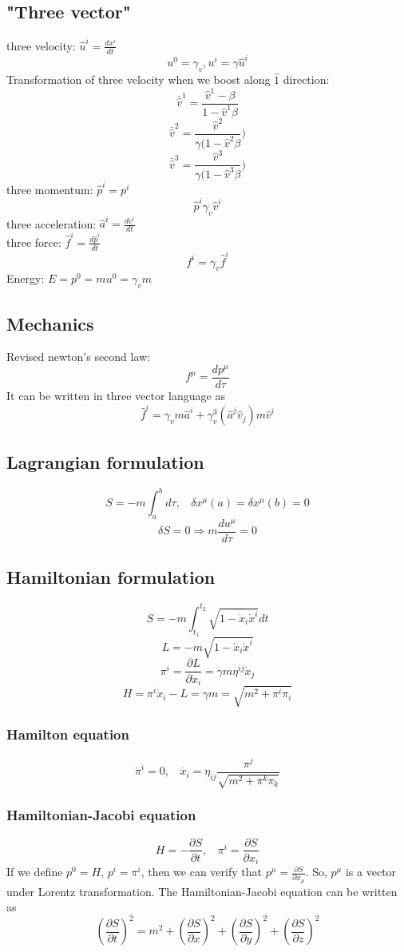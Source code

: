 \documentclass{article}
\begin{document}
\subsection{"Three vector"}
three velocity: $\hat{u}^{i} = \frac{dx^i}{dt}$
\[u^0 = \gamma_v, u^i = \gamma \hat{u}^i\]
Transformation of three velocity when we boost along $\hat{1}$ direction:
\[\bar{\hat{v}}^1 = \frac{\hat{v}^1 - \beta}{1-\hat{v}^1 \beta}\]
\[\bar{\hat{v}}^2 = \frac{\hat{v}^2}{\gamma(1-\hat{v}^2 \beta})\]
\[\bar{\hat{v}}^3 = \frac{\hat{v}^3}{\gamma(1-\hat{v}^3 \beta})\]
three momentum: $\hat{p}^{i} = p^i$
\[\hat{p}^{i} \gamma_v \hat{v}^i\]
three acceleration: $\hat{a}^{i} = \frac{dv^i}{dt}$\\
three force: $\hat{f}^i = \frac{d\hat{p}^i}{dt}$
\[f^i = \gamma_v \hat{f}^i\]
Energy: $E = p^0 = m u^0 = \gamma_v m$


\subsection{Mechanics}
Revised newton's second law:
\[f^{\mu} = \frac{dp^{\mu}}{d\tau}\]
It can be written in three vector language as
\[\hat{f}^i = \gamma_v m \hat{a}^i + \gamma_v^3 (\hat{a}^j \hat{v}_j) m \hat{v}^i\]

\subsection{Lagrangian formulation}
\[S=-m\int_{a}^{b} d\tau, \ \ \ \ \delta x^{\mu}(a) = \delta x^{\mu}(b) = 0\]
\[\delta S = 0 \Rightarrow m\frac{du^{\mu}}{d\tau} = 0\]

\subsection{Hamiltonian formulation}
\[S = -m \int_{t_1}^{t_2} \sqrt{1-\dot{x}_i\dot{x}^i} dt\]
\[L = - m \sqrt{1-\dot{x}_i\dot{x}^i}\]
\[\pi^i = \frac{\partial L}{\partial \dot{x}_i} = \gamma m \eta^{ij}\dot{x}_j\]
\[H = \pi^i \dot{x}_i - L = \gamma m = \sqrt{m^2 + \pi^i \pi_i}\]
\subsubsection{Hamilton equation}
\[\dot{\pi}^i = 0, \ \ \ \ \dot{x_i} = \eta_{ij}\frac{\pi^j}{\sqrt{m^2 + \pi^k \pi_k}}\]

\subsubsection{Hamiltonian-Jacobi equation}
\[H = -\frac{\partial S}{\partial t}, \ \ \ \ \pi^i = \frac{\partial S}{\partial x_i}\]
If we define $p^0 = H$, $p^i = \pi^i$, then we can verify that $p^{\mu} = \frac{\partial S}{\partial x_{\mu}}$. So, $p^{\mu}$ is a vector under Lorentz transformation. The Hamiltonian-Jacobi equation can be written as
\[(\frac{\partial S}{\partial t})^2 = m^2 + (\frac{\partial S}{\partial x})^2 + (\frac{\partial S}{\partial y})^2 + (\frac{\partial S}{\partial z})^2\]
\end{document}
